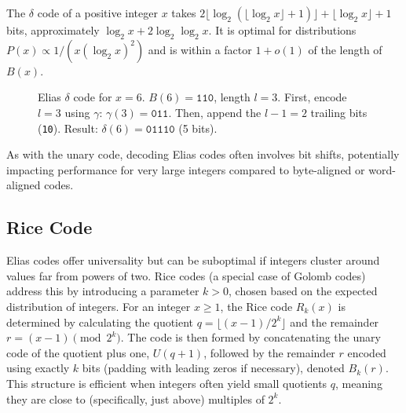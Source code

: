 \begin{theorem}
    The $\delta$ code of a positive integer $x$ takes $2\lfloor \log_2 (\lfloor \log_2 x \rfloor + 1) \rfloor + \lfloor \log_2 x \rfloor + 1$ bits, approximately $\log_2 x + 2\log_2 \log_2 x$. It is optimal for distributions $P(x) \propto 1/(x(\log_2 x)^2)$ and is within a factor $1+o(1)$ of the length of $B(x)$.
\end{theorem}

\begin{figure}[hbtp]
    \centering
    \caption{Elias $\delta$ code for $x=6$. $B(6)=\texttt{110}$, length $l=3$. First, encode $l=3$ using $\gamma$: $\gamma(3)=\texttt{011}$. Then, append the $l-1=2$ trailing bits (\texttt{10}). Result: $\delta(6)=\texttt{01110}$ (5 bits).}
    \label{fig:delta_code_example}
\end{figure}

\noindent As with the unary code, decoding Elias codes often involves bit shifts, potentially impacting performance for very large integers compared to byte-aligned or word-aligned codes.

\subsection{Rice Code}
Elias codes offer universality but can be suboptimal if integers cluster around values far from powers of two. Rice codes \cite{rice1979some} (a special case of Golomb codes) address this by introducing a parameter $k > 0$, chosen based on the expected distribution of integers. For an integer $x \ge 1$, the Rice code $R_k(x)$ is determined by calculating the quotient $q = \lfloor (x-1) / 2^k \rfloor$ and the remainder $r = (x-1) \pmod{2^k}$. The code is then formed by concatenating the unary code of the quotient plus one, $U(q+1)$, followed by the remainder $r$ encoded using exactly $k$ bits (padding with leading zeros if necessary), denoted $B_k(r)$. This structure is efficient when integers often yield small quotients $q$, meaning they are close to (specifically, just above) multiples of $2^k$.

